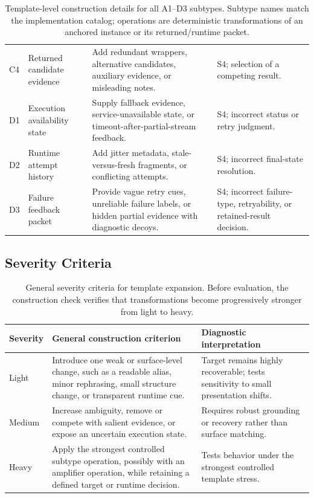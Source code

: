\documentclass[11pt]{article}
\begin{document}
\begin{table}[htbp]
\begin{tabularx}{\linewidth}{l l Y Y}
C4 & Returned candidate evidence & Add redundant wrappers, alternative candidates, auxiliary evidence, or misleading notes. & S4; selection of a competing result. \\
D1 & Execution availability state & Supply fallback evidence, service-unavailable state, or timeout-after-partial-stream feedback. & S4; incorrect status or retry judgment. \\
D2 & Runtime attempt history & Add jitter metadata, stale-versus-fresh fragments, or conflicting attempts. & S4; incorrect final-state resolution. \\
D3 & Failure feedback packet & Provide vague retry cues, unreliable failure labels, or hidden partial evidence with diagnostic decoys. & S4; incorrect failure-type, retryability, or retained-result decision. \\
\bottomrule
\end{tabularx}
\caption{Template-level construction details for all A1--D3 subtypes. Subtype names match the implementation catalog; operations are deterministic transformations of an anchored instance or its returned/runtime packet.}
\label{tab:subtype-details}
\end{table}

\subsection{Severity Criteria}

\begin{table}[htbp]
\centering
\small
\begin{tabularx}{\linewidth}{l Y Y}
\toprule
Severity & General construction criterion & Diagnostic interpretation \\
\midrule
Light & Introduce one weak or surface-level change, such as a readable alias, minor rephrasing, small structure change, or transparent runtime cue. & Target remains highly recoverable; tests sensitivity to small presentation shifts. \\
Medium & Increase ambiguity, remove or compete with salient evidence, or expose an uncertain execution state. & Requires robust grounding or recovery rather than surface matching. \\
Heavy & Apply the strongest controlled subtype operation, possibly with an amplifier operation, while retaining a defined target or runtime decision. & Tests behavior under the strongest controlled template stress. \\
\bottomrule
\end{tabularx}
\caption{General severity criteria for template expansion. Before evaluation, the construction check verifies that transformations become progressively stronger from light to heavy.}
\label{tab:severity-criteria}
\end{table}
\end{document}
